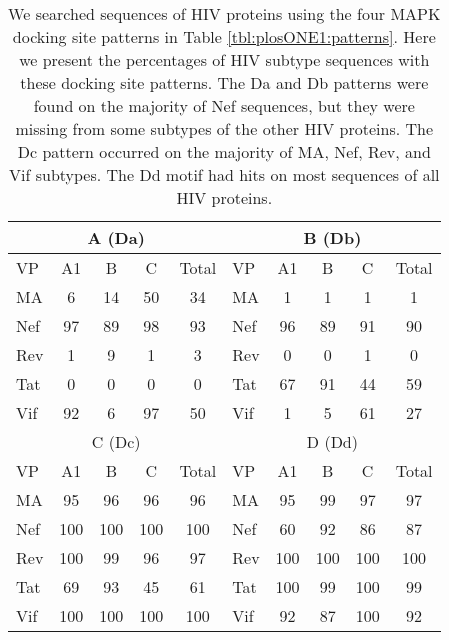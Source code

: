 \begin{table}\footnotesize
\begin{center}
\begin{tabular}{|l|c|c|c|c||l|c|c|c|c|}
\hline
\multicolumn{5}{|c||}{A (Da)} & \multicolumn{5}{|c|}{B (Db)}\\
\hline
VP & A1 & B & C & Total & VP & A1 & B & C & Total\\
\hline
MA&	6&	14&	50&	34&	MA&	1&	1&	1&	1\\
Nef&	97&	89&	98&	93&	Nef&	96&	89&	91&	90\\
Rev&	1&	9&	1&	3&	Rev&	0&	0&	1&	0\\
Tat&	0&	0&	0&	0&	Tat&	67&	91&	44&	59\\
Vif&	92&	6&	97&	50&	Vif&	1&	5&	61&	27\\
\hline
\hline
\multicolumn{5}{|c||}{C (Dc)} & \multicolumn{5}{|c|}{D (Dd)}\\
\hline
VP & A1 & B & C & Total & VP & A1 & B & C & Total\\
MA&	95&	96&	96&	96&	MA&	95&	99&	97&	97\\
Nef&	100&	100&	100&	100&	Nef&	60&	92&	86&	87\\
Rev&	100&	99&	96&	97&	Rev&	100&	100&	100&	100\\
Tat&	69&	93&	45&	61&	Tat&	100&	99&	100&	99\\
Vif&	100&	100&	100&	100&	Vif&	92&	87&	100&	92\\
\hline
  \end{tabular}
\end{center}
\caption[MAPK docking pattern hits on HIV proteins]{\small We searched sequences of HIV proteins using the four MAPK docking site patterns in Table \ref{tbl:plosONE1:patterns}. Here we present the percentages of HIV subtype sequences with these docking site patterns. The Da and Db  patterns were found on the majority of Nef sequences, but they were missing from some subtypes of the other HIV proteins. The Dc pattern occurred on the majority of MA, Nef, Rev, and Vif subtypes. The Dd  motif had hits on most sequences of all HIV proteins. \label{tbl:plosONE2:percents}}
\end{table}

